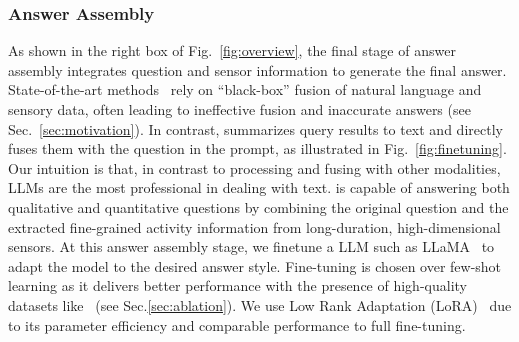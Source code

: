 \subsubsection{Answer Assembly}
\label{sec:answer-assembly}
As shown in the right box of Fig.~\ref{fig:overview}, the final stage of answer assembly integrates question and sensor information to generate the final answer.
State-of-the-art methods~\cite{xing2021deepsqa,zhang2023llama,moon-etal-2023-imu2clip} rely on ``black-box'' fusion of natural language and sensory data, often leading to ineffective fusion and inaccurate answers (see Sec.~\ref{sec:motivation}).
In contrast, \Method summarizes query results to text and directly fuses them with the question in the prompt, as illustrated in Fig.~\ref{fig:finetuning}.
Our intuition is that, in contrast to processing and fusing with other modalities, LLMs are the most professional in dealing with text.
\Method is capable of answering both qualitative and quantitative questions by combining the original question and the extracted fine-grained activity information from long-duration, high-dimensional sensors.
At this answer assembly stage, we finetune a LLM such as LLaMA~\cite{zhang2023llama} to adapt the model to the desired answer style. Fine-tuning is chosen over few-shot learning as it delivers better performance with the presence of high-quality datasets like \Dataset~\citesensorqa (see Sec.\ref{sec:ablation}). We use Low Rank Adaptation (LoRA)~\cite{hu2021lora} due to its parameter efficiency and comparable performance to full fine-tuning.






